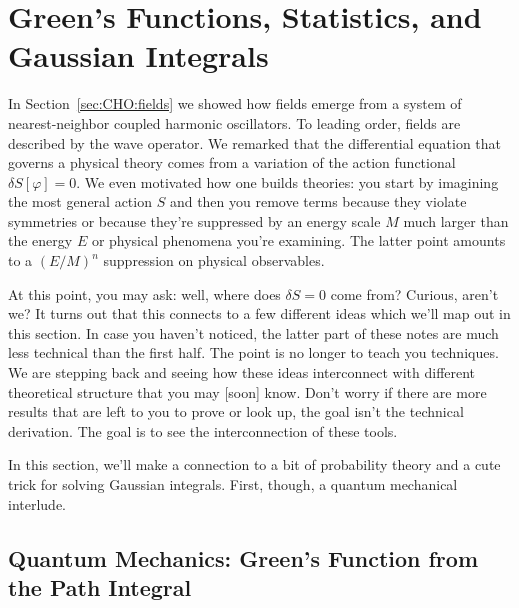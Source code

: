 \section{Green's Functions, Statistics, and Gaussian Integrals}

In Section~\ref{sec:CHO:fields} we showed how fields emerge from a system of nearest-neighbor coupled harmonic oscillators. To leading order, fields are described by the wave operator. We remarked that the differential equation that governs a physical theory comes from a variation of the action functional $\delta S[\varphi]=0$. We even motivated how one builds theories: you start by imagining the most general action $S$ and then you remove terms because they violate symmetries or because they're suppressed by an energy scale $M$ much larger than the energy $E$ or physical phenomena you're examining. The latter point amounts to a $(E/M)^n$ suppression on physical observables. 

At this point, you may ask: well, where does $\delta S = 0$ come from? Curious, aren't we? It turns out that this connects to a few different ideas which we'll map out in this section. In case you haven't noticed, the latter part of these notes are much less technical than the first half. The point is no longer to teach you techniques. We are stepping back and seeing how these ideas interconnect with different theoretical structure that you may [soon] know. Don't worry if there are more results that are left to you to prove or look up, the goal isn't the technical derivation. The goal is to see the interconnection of these tools.

In this section, we'll make a connection to a bit of probability theory and a cute trick for solving Gaussian integrals. First, though, a quantum mechanical interlude.

\subsection{Quantum Mechanics: Green's Function from the Path Integral}

